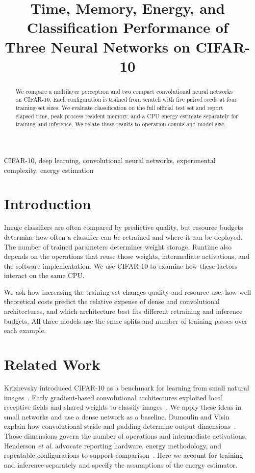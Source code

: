 \documentclass[conference]{IEEEtran}
\title{Time, Memory, Energy, and Classification Performance of Three Neural Networks on CIFAR-10}
\begin{document}
\maketitle
\begin{abstract}
We compare a multilayer perceptron and two compact convolutional neural networks on CIFAR-10. Each configuration is trained from scratch with five paired seeds at four training-set sizes. We evaluate classification on the full official test set and report elapsed time, peak process resident memory, and a CPU energy estimate separately for training and inference. \AbstractResults{} We relate these results to operation counts and model size.
\end{abstract}
\begin{IEEEkeywords}
CIFAR-10, deep learning, convolutional neural networks, experimental complexity, energy estimation
\end{IEEEkeywords}

\section{Introduction}
Image classifiers are often compared by predictive quality, but resource budgets determine how often a classifier can be retrained and where it can be deployed. The number of trained parameters determines weight storage. Runtime also depends on the operations that reuse those weights, intermediate activations, and the software implementation. We use CIFAR-10 to examine how these factors interact on the same CPU.

We ask how increasing the training set changes quality and resource use, how well theoretical costs predict the relative expense of dense and convolutional architectures, and which architecture best fits different retraining and inference budgets. All three models use the same splits and number of training passes over each example.

\section{Related Work}
Krizhevsky introduced CIFAR-10 as a benchmark for learning from small natural images~\cite{krizhevsky,cifar}. Early gradient-based convolutional architectures exploited local receptive fields and shared weights to classify images~\cite{lecun}. We apply these ideas in small networks and use a dense network as a baseline. Dumoulin and Visin explain how convolutional stride and padding determine output dimensions~\cite{dumoulin}. Those dimensions govern the number of operations and intermediate activations. Henderson \emph{et al.} advocate reporting hardware, energy methodology, and repeatable configurations to support comparison~\cite{henderson}. Here we account for training and inference separately and specify the assumptions of the energy estimator.
\end{document}
